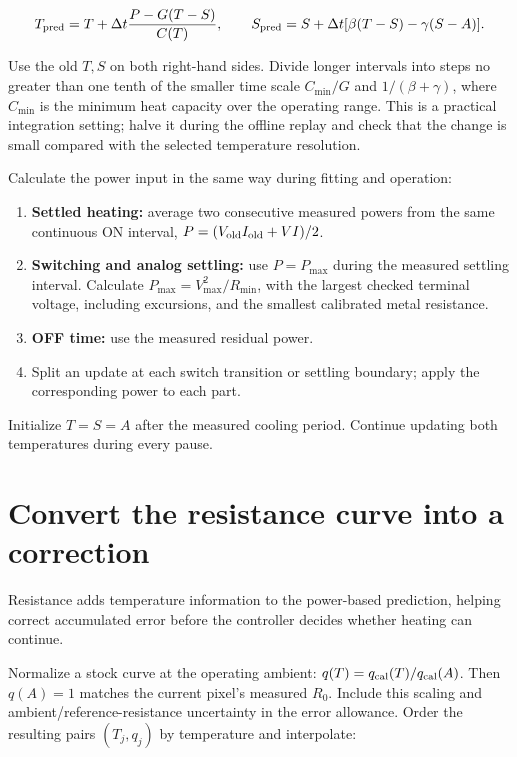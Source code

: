 \documentclass[11pt,letterpaper]{article}
\begin{document}
\[
T_{\rm pred}=T+\Delta t\frac{P-G(T-S)}{C(T)},\qquad
S_{\rm pred}=S+\Delta t[\beta(T-S)-\gamma(S-A)].
\]

Use the old \(T,S\) on both right-hand sides. Divide longer intervals into steps no greater than one tenth of the smaller time scale \(C_{\min}/G\) and \(1/(\beta+\gamma)\), where \(C_{\min}\) is the minimum heat capacity over the operating range. This is a practical integration setting; halve it during the offline replay and check that the change is small compared with the selected temperature resolution.

Calculate the power input in the same way during fitting and operation:

\begin{enumerate}[start=1]
\item \textbf{Settled heating:} average two consecutive measured powers from the same continuous ON interval, \(P=(V_{\rm old}I_{\rm old}+VI)/2\).
\item \textbf{Switching and analog settling:} use \(P=P_{\max}\) during the measured settling interval. Calculate \(P_{\max}=V_{\max}^2/R_{\min}\), with the largest checked terminal voltage, including excursions, and the smallest calibrated metal resistance.
\item \textbf{OFF time:} use the measured residual power.
\item Split an update at each switch transition or settling boundary; apply the corresponding power to each part.
\end{enumerate}

Initialize \(T=S=A\) after the measured cooling period. Continue updating both temperatures during every pause.

\section{Convert the resistance curve into a correction}

Resistance adds temperature information to the power-based prediction, helping correct accumulated error before the controller decides whether heating can continue.

Normalize a stock curve at the operating ambient: \(q(T)=q_{\rm cal}(T)/q_{\rm cal}(A)\). Then \(q(A)=1\) matches the current pixel's measured \(R_0\). Include this scaling and ambient/reference-resistance uncertainty in the error allowance. Order the resulting pairs \((T_j,q_j)\) by temperature and interpolate:
\end{document}

